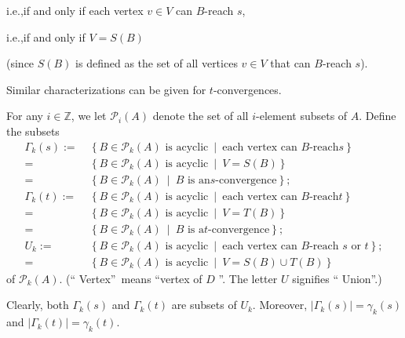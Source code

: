 \documentclass[numbers=enddot,12pt,final,onecolumn,notitlepage]{scrartcl}%
\theoremstyle{definition}
\theoremstyle{plainsl}
\begin{document}
\qquad i.e.,\quad if and only if each vertex $v\in V$ can $B$-reach $s$,

\qquad i.e.,\quad if and only if $V=S\left(  B\right)  $

\noindent(since $S\left(  B\right)  $ is defined as the set of all vertices
$v\in V$ that can $B$-reach $s$).

Similar characterizations can be given for $t$-convergences.

For any $i\in\mathbb{Z}$, we let $\mathcal{P}_{i}\left(  A\right)  $ denote
the set of all $i$-element subsets of $A$. Define the subsets%
\begin{align*}
\Gamma_{k}\left(  s\right)  :=  &  \ \left\{  B\in\mathcal{P}_{k}\left(
A\right)  \text{ is acyclic}\ \mid\ \text{each vertex can }B\text{-reach
}s\right\} \\
=  &  \ \left\{  B\in\mathcal{P}_{k}\left(  A\right)  \text{ is acyclic}%
\ \mid\ V=S\left(  B\right)  \right\} \\
=  &  \ \left\{  B\in\mathcal{P}_{k}\left(  A\right)  \ \mid\ B\text{ is an
}s\text{-convergence}\right\}  ;\\
\Gamma_{k}\left(  t\right)  :=  &  \ \left\{  B\in\mathcal{P}_{k}\left(
A\right)  \text{ is acyclic}\ \mid\ \text{each vertex can }B\text{-reach
}t\right\} \\
=  &  \ \left\{  B\in\mathcal{P}_{k}\left(  A\right)  \text{ is acyclic}%
\ \mid\ V=T\left(  B\right)  \right\} \\
=  &  \ \left\{  B\in\mathcal{P}_{k}\left(  A\right)  \ \mid\ B\text{ is a
}t\text{-convergence}\right\}  ;\\
U_{k}:=  &  \ \left\{  B\in\mathcal{P}_{k}\left(  A\right)  \text{ is
acyclic}\ \mid\ \text{each vertex can }B\text{-reach }s\text{ or }t\right\}
;\\
=  &  \ \left\{  B\in\mathcal{P}_{k}\left(  A\right)  \text{ is acyclic}%
\ \mid\ V=S\left(  B\right)  \cup T\left(  B\right)  \right\}
\end{align*}
of $\mathcal{P}_{k}\left(  A\right)  $. (\textquotedblleft
Vertex\textquotedblright\ means \textquotedblleft vertex of $D$%
\textquotedblright. The letter $U$ signifies \textquotedblleft
Union\textquotedblright.)

Clearly, both $\Gamma_{k}\left(  s\right)  $ and $\Gamma_{k}\left(  t\right)
$ are subsets of $U_{k}$. Moreover, $\left\vert \Gamma_{k}\left(  s\right)
\right\vert =\gamma_{k}\left(  s\right)  $ and $\left\vert \Gamma_{k}\left(
t\right)  \right\vert =\gamma_{k}\left(  t\right)  $.
\end{document}
